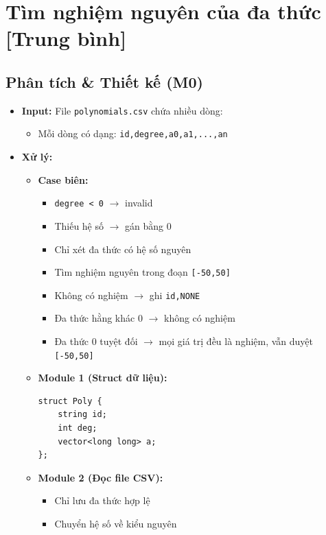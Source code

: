 \section{Tìm nghiệm nguyên của đa thức [Trung bình]}
\subsection{Phân tích \& Thiết kế (M0)}
\begin{itemize}
    \item \textbf{Input:}
    File \texttt{polynomials.csv} chứa nhiều dòng:
    \begin{itemize}
        \item Mỗi dòng có dạng:
        \texttt{id,degree,a0,a1,...,an}
    \end{itemize}

    \item \textbf{Xử lý:}
    \begin{itemize}
        \item \textbf{Case biên:}
        \begin{itemize}
            \item \texttt{degree < 0} $\rightarrow$ invalid
            \item Thiếu hệ số $\rightarrow$ gán bằng 0
            \item Chỉ xét đa thức có hệ số nguyên
            \item Tìm nghiệm nguyên trong đoạn \texttt{[-50,50]}
            \item Không có nghiệm $\rightarrow$ ghi \texttt{id,NONE}
            \item Đa thức hằng khác 0 $\rightarrow$ không có nghiệm
            \item Đa thức 0 tuyệt đối $\rightarrow$ mọi giá trị đều là nghiệm, vẫn duyệt \texttt{[-50,50]}
        \end{itemize}

        \item \textbf{Module 1 (Struct dữ liệu):}
\begin{lstlisting}
struct Poly {
    string id;
    int deg;
    vector<long long> a;
};
\end{lstlisting}

        \item \textbf{Module 2 (Đọc file CSV):}
        \begin{itemize}
            \item Chỉ lưu đa thức hợp lệ
            \item Chuyển hệ số về kiểu nguyên
        \end{itemize}


\end{itemize}
\end{itemize}
